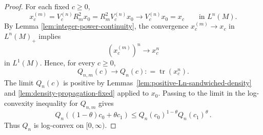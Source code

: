 \documentclass[11pt,a4paper]{article}
\theoremstyle{plain}
\numberwithin{theorem}{section}
\theoremstyle{definition}
\newcommand{\?}{\overset{?}{=}}
\newcommand{\defeq}{\mathrel{\mathop:}=}
\DeclareMathOperator{\tr}{tr}
\begin{document}
\begin{proof}
For each fixed $c\geq 0$,
\begin{equation*}
  x_c^{(m)}=V_c^{(n)}R_m^2x_0 =R_m^2V_c^{(n)}x_0 \longrightarrow V_c^{(n)}x_0=x_c \qquad\text{in }L^n(M).
\end{equation*}
By Lemma \ref{lem:integer-power-continuity}, the convergence
\(x_c^{(m)}\to x_c\) in \(L^n(M)_+\) implies
\[
(x_c^{(m)})^n \to x_c^n
\]
in \(L^1(M)\).
Hence, for every $c\geq 0$,
\begin{equation*}
  Q_{n,m}(c)\longrightarrow Q_n(c) \defeq \tr(x_c^n).
\end{equation*}
The limit $Q_n(c)$ is positive by Lemmas~\ref{lem:positive-Ln-sandwiched-density} and \ref{lem:density-propagation-fixed} applied to $x_0$. 
Passing to the limit in the log-convexity inequality for $Q_{n,m}$ gives
\begin{equation*}
  Q_n((1-\theta)c_0+\theta c_1)
  \leq Q_n(c_0)^{1-\theta}Q_n(c_1)^\theta\,.
\end{equation*}
Thus $Q_n$ is log-convex on $[0,\infty)$.
\end{proof}
\end{document}
